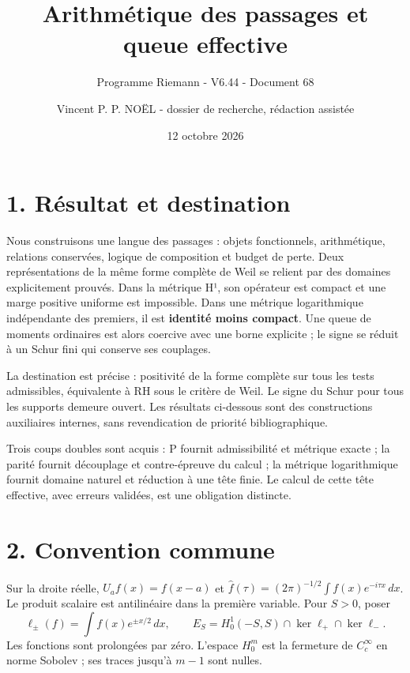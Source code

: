 \documentclass[
  10pt,
  a4paper,
]{article}
\title{Arithmétique des passages et queue effective}
\subtitle{Programme Riemann - V6.44 - Document 68}
\author{Vincent P. P. NOËL - dossier de recherche, rédaction assistée}
\date{12 octobre 2026}
\begin{document}
\maketitle

{
\setcounter{tocdepth}{2}
\tableofcontents
}
\hypertarget{ruxe9sultat-et-destination}{%
\section{1. Résultat et destination}\label{ruxe9sultat-et-destination}}

Nous construisons une langue des passages : objets fonctionnels,
arithmétique, relations conservées, logique de composition et budget de
perte. Deux représentations de la même forme complète de Weil se relient
par des domaines explicitement prouvés. Dans la métrique H¹, son
opérateur est compact et une marge positive uniforme est impossible.
Dans une métrique logarithmique indépendante des premiers, il est
\textbf{identité moins compact}. Une queue de moments ordinaires est
alors coercive avec une borne explicite ; le signe se réduit à un Schur
fini qui conserve ses couplages.

La destination est précise : positivité de la forme complète sur tous
les tests admissibles, équivalente à RH sous le critère de Weil. Le
signe du Schur pour tous les supports demeure ouvert. Les résultats
ci-dessous sont des constructions auxiliaires internes, sans
revendication de priorité bibliographique.

Trois coups doubles sont acquis : P fournit admissibilité et métrique
exacte ; la parité fournit découplage et contre-épreuve du calcul ; la
métrique logarithmique fournit domaine naturel et réduction à une tête
finie. Le calcul de cette tête effective, avec erreurs validées, est une
obligation distincte.

\hypertarget{convention-commune}{%
\section{2. Convention commune}\label{convention-commune}}

Sur la droite réelle, \(U_a f(x)=f(x-a)\) et
\(\widehat f(\tau)=(2\pi)^{-1/2}\int f(x)e^{-i\tau x}\,dx\). Le produit
scalaire est antilinéaire dans la première variable. Pour \(S>0\), poser
\[
\ell_\pm(f)=\int f(x)e^{\pm x/2}\,dx,\qquad
E_S=H_0^1(-S,S)\cap\ker\ell_+\cap\ker\ell_- .
\] Les fonctions sont prolongées par zéro. L'espace \(H_0^m\) est la
fermeture de \(C_c^\infty\) en norme Sobolev ; ses traces jusqu'à
\(m-1\) sont nulles.
\end{document}
